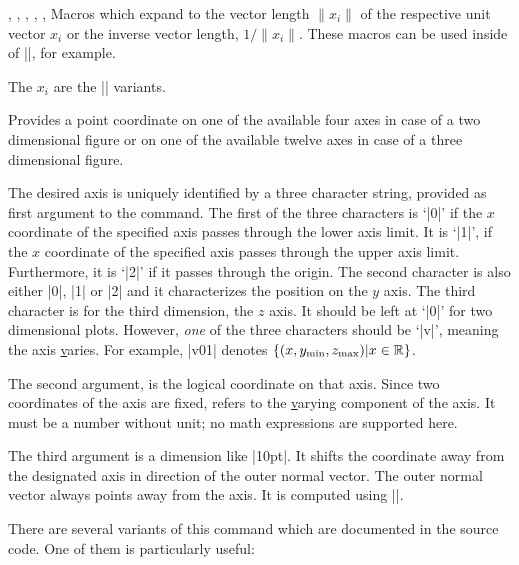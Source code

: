 \begin{commandlist}{%
    \pgfplotsunitxlength,
    \pgfplotsunitylength,
    \pgfplotsunitzlength,
    \pgfplotsunitxinvlength,
    \pgfplotsunityinvlength,
    \pgfplotsunitzinvlength%
}
    Macros which expand to the vector length $\lVert x_i \rVert$ of the
    respective unit vector $x_i$ or the inverse vector length, $1/\lVert x_i
    \rVert$. These macros can be used inside of |\pgfmathparse|, for example.

    The $x_i$ are the |\pgfplotspointunitx| variants.
\end{commandlist}

\begin{command}{\pgfplotsqpointoutsideofaxis%
}
    Provides a point coordinate on one of the available four axes in case of a
    two dimensional figure or on one of the available twelve axes in case of a
    three dimensional figure.

    The desired axis is uniquely identified by a three character string,
    provided as first argument to the command. The first of the three
    characters is `|0|' if the $x$ coordinate of the specified axis passes
    through the lower axis limit. It is `|1|', if the $x$ coordinate of the
    specified axis passes through the upper axis limit. Furthermore, it is
    `|2|' if it passes through the origin. The second character is also either
    |0|, |1| or |2| and it characterizes the position on the $y$ axis. The
    third character is for the third dimension, the $z$ axis. It should be left
    at `|0|' for two dimensional plots. However, \emph{one} of the three
    characters should be `|v|', meaning the axis \underline varies. For
    example, |v01| denotes $\{ (x,y_{\min},z_{\max}) \vert x \in \mathbb{R} \}$.

    The second argument,  is the logical coordinate on that
    axis. Since two coordinates of the axis are fixed,  refers
    to the \underline varying component of the axis. It must be a number
    without unit; no math expressions are supported here.

    The third argument  is a dimension like |10pt|. It
    shifts the coordinate away from the designated axis in direction of the
    outer normal vector. The outer normal vector always points away from the
    axis. It is computed using |\pgfplotspointouternormalvectorofaxis|.

    There are several variants of this command which are documented in the
    source code. One of them is particularly useful:
\end{command}

